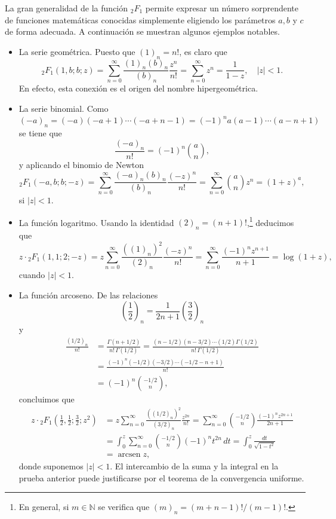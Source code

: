 \documentclass[12pt,a4paper]{book}
\renewcommand{\arcsin}{\operatorname{arcsen}}
\begin{document}
La gran generalidad de la función ${}_{2}F_{1}$ permite expresar un número sorprendente de funciones matemáticas conocidas simplemente eligiendo los parámetros $a, b$ y $c$ de forma adecuada. A continuación se muestran algunos ejemplos notables.

\begin{itemize}
    \item La serie geométrica. Puesto que $(1)_n = n!$, es claro que
    \[ {}_{2}F_{1}(1,b;b;z) = \sum_{n=0}^{\infty} \frac{(1)_n (b)_n}{(b)_n} \frac{z^n}{n!} = \sum_{n=0}^{\infty} z^n = \frac{1}{1-z}, \quad |z|<1. \]
    En efecto, esta conexión es el origen del nombre hipergeométrica.  


    \item La serie binomial. Como $(-a)_n = (-a)(-a+1)\cdots(-a+n-1) = (-1)^n a(a-1)\cdots(a-n+1)$ se tiene que
    \[
    \frac{(-a)_n}{n!}= (-1)^n \binom{a}{n},
    \]
    y aplicando el binomio de Newton
    \[ {}_{2}F_{1}(-a,b;b;-z) = \sum_{n=0}^{\infty} \frac{(-a)_n (b)_n}{(b)_n}\frac{(-z)^n}{n!} = \sum_{n=0}^{\infty}\binom{a}{n} z^n = (1+z)^a,\]
    si $|z|<1$.

    \item La función logaritmo. Usando la identidad $(2)_n = (n+1)!$,\footnote{En general, si $m \in \mathbb{N}$ se verifica que $(m)_n = (m+n-1)!/(m-1)!$.} deducimos que 
    \[ z \cdot {}_{2}F_{1}(1,1;2;-z) = z \sum_{n=0}^{\infty} \frac{((1)_n)^2}{(2)_n}\frac{(-z)^n}{n!} = \sum_{n=0}^{\infty} \frac{(-1)^n z^{n+1}}{n+1} = \log(1+z), \]
    cuando $|z|<1$.

    \item La función arcoseno. De las relaciones 
    \begin{equation}
    \label{eq1}
        \left(\frac{1}{2}\right)_n = \frac{1}{2n+1} \left(\frac{3}{2}\right)_n
    \end{equation}
    y
    \begin{equation}
    \label{eq2}
    \begin{aligned}
        \frac{(1/2)_n}{n!} &= \frac{\Gamma(n+1/2)}{n! \, \Gamma(1/2)} =  \frac{(n-1/2)(n-3/2) \cdots (1/2)\Gamma(1/2)}{n! \, \Gamma(1/2)} \\
        &= \frac{(-1)^n(-1/2)(-3/2) \cdots (-1/2 -n +1)}{n!} \\&= (-1)^n \binom{-1/2}{n},
    \end{aligned}
\end{equation}
    concluimos que 
    \begin{align*}
      z \cdot {}_{2}F_{1}\left(\frac{1}{2}, \frac{1}{2}; \frac{3}{2}; z^2\right) &= z \sum_{n=0}^{\infty} \frac{((1/2)_n)^2}{(3/2)_n}\frac{z^{2n}}{n!} = \sum_{n=0}^{\infty}\binom{-1/2}{n} \frac{(-1)^n z^{2n+1}}{2n+1} \\ &= \int_0^z \sum_{n=0}^\infty \binom{-1/2}{n} (-1)^nt^{2n} \, dt= \int_0^z\frac{dt}{\sqrt{1-t^2}} \\ &=  \arcsin z,  
    \end{align*}
    donde suponemos $|z|<1$. El intercambio de la suma y la integral en la prueba anterior puede justificarse por el teorema de la convergencia uniforme.


\end{itemize}
\end{document}

